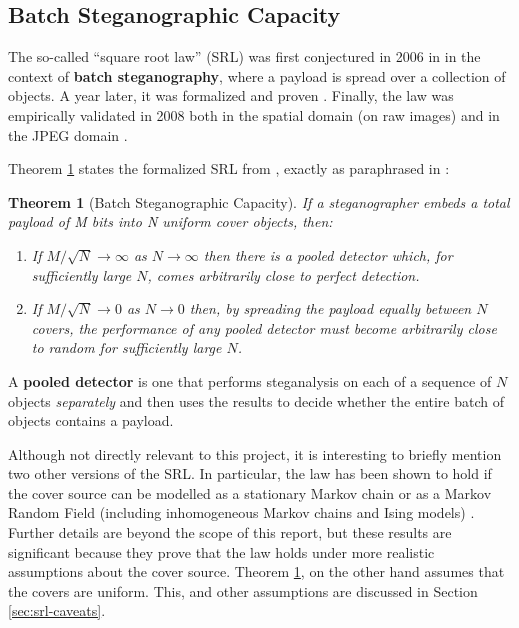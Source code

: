 \documentclass[11pt,a4paper,twoside,openright]{report}
\begin{document}
\subsection{Batch Steganographic Capacity} \label{sec:batch-capacity}

The so-called ``square root law'' (SRL) was first conjectured in 2006 in \cite{2006-batch-conjecture} in the context of \textbf{batch steganography}, where a payload is spread over a collection of objects. A year later, it was formalized and proven \cite{2007-batch-proof}. Finally, the law was empirically validated in 2008 both in the spatial domain (on raw images) and in the JPEG domain \cite{2008-paper}.

Theorem \ref{thm:square-root-law-batch} states the formalized SRL from \cite{2007-batch-proof}, exactly as paraphrased in \cite{2008-paper}:

\newtheorem{square-root-law}{Theorem}
\begin{square-root-law}[Batch Steganographic Capacity] \label{thm:square-root-law-batch}
If a steganographer embeds a total payload of M bits into N uniform cover objects, then:
\begin{enumerate}
	\item If $M/\sqrt{N} \to \infty$ as $N \to \infty$ then there is a pooled detector which, for sufficiently large $N$, comes arbitrarily close to perfect detection.
	\item If $M/\sqrt{N} \to 0$ as $N \to 0$ then, by spreading the payload equally between $N$ covers, the performance of any pooled detector must become arbitrarily close to random for sufficiently large $N$.
\end{enumerate}
\end{square-root-law}

A \textbf{pooled detector} is one that performs steganalysis on each of a sequence of $N$ objects \textit{separately} and then uses the results to decide whether the entire batch of objects contains a payload.

Although not directly relevant to this project, it is interesting to briefly mention two other versions of the SRL. In particular, the law has been shown to hold if the cover source can be modelled as a stationary Markov chain \cite{srl-markov-covers} or as a Markov Random Field (including inhomogeneous Markov chains and Ising models) \cite{srl-markov-random-fields}. Further details are beyond the scope of this report, but these results are significant because they prove that the law holds under more realistic assumptions about the cover source. Theorem \ref{thm:square-root-law-batch}, on the other hand assumes that the covers are uniform. This, and other assumptions are discussed in Section \ref{sec:srl-caveats}.
\end{document}
